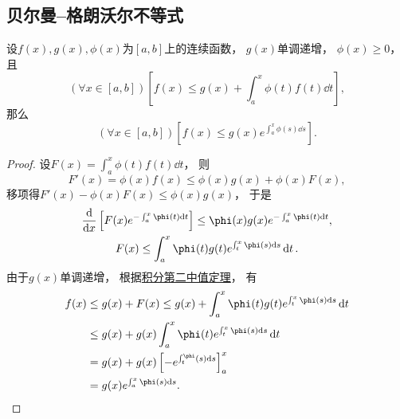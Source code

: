 \subsection{贝尔曼--格朗沃尔不等式}
\begin{theorem}\label{theorem:定积分.贝尔曼--格朗沃尔不等式}
设\(f(x),g(x),\phi(x)\)为\([a,b]\)上的连续函数，
\(g(x)\)单调递增，
\(\phi(x)\geq0\)，
且\begin{equation*}
	(\forall x \in [a,b])
	\left[
		f(x) \leq g(x) + \int_a^x \phi(t) f(t) \dd{t}
	\right],
\end{equation*}
那么\begin{equation*}
	(\forall x \in [a,b])
	\left[
		f(x) \leq g(x) e^{\int_a^x \phi(s) \dd{s}}
	\right].
\end{equation*}
\begin{proof}
设\(F(x) = \int_a^x \phi(t) f(t) \dd{t}\)，
则\begin{equation*}
	F'(x) = \phi(x) f(x) \leq \phi(x) g(x) + \phi(x) F(x),
\end{equation*}
移项得\(F'(x) - \phi(x) F(x) \leq \phi(x) g(x)\)，
于是\begin{gather*}
	\dv{x}\left[F(x) e^{-\int_a^x \phi(t) \dd{t}}\right]
	\leq \phi(x) g(x) e^{-\int_a^x \phi(t) \dd{t}}, \\
	F(x) \leq \int_a^x \phi(t) g(t) e^{\int_t^x \phi(s) \dd{s}} \dd{t}.
\end{gather*}
由于\(g(x)\)单调递增，
根据\hyperref[theorem:定积分.积分中值定理2]{积分第二中值定理}，
有\begin{align*}
	f(x) &\leq g(x) + F(x)
		\leq g(x) + \int_a^x \phi(t) g(t) e^{\int_t^x \phi(s) \dd{s}} \dd{t} \\
	&\leq g(x) + g(x) \int_a^x \phi(t) e^{\int_t^x \phi(s) \dd{s}} \dd{t} \\
	&= g(x) + g(x) \left[-e^{\int_t^ \phi(s) \dd{s}}\right]_a^x \\
	&= g(x) e^{\int_a^x \phi(s) \dd{s}}.
	\qedhere
\end{align*}
\end{proof}
\end{theorem}
